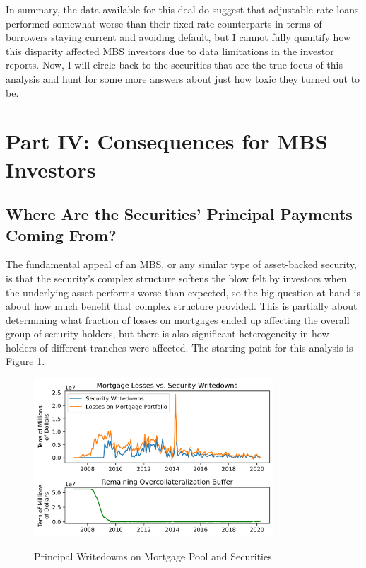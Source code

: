 \documentclass[12pt]{article}
\begin{document}
In summary, the data available for this deal do suggest that adjustable-rate loans performed somewhat worse than their fixed-rate counterparts in terms of borrowers staying current and avoiding default, but I cannot fully quantify how this disparity affected MBS investors due to data limitations in the investor reports. Now, I will circle back to the securities that are the true focus of  this analysis and hunt for some more answers about just how toxic they turned out to be.

\section*{Part IV: Consequences for MBS Investors}

\subsection*{Where Are the Securities' Principal Payments Coming From?}

The fundamental appeal of an MBS, or any similar type of asset-backed security, is that the security’s complex structure softens the blow felt by investors when the underlying asset performs worse than expected, so the big question at hand is about how much benefit that complex structure provided. This is partially about determining what fraction of losses on mortgages ended up affecting the overall group of security holders, but there is also significant heterogeneity in how holders of different tranches were affected. The starting point for this analysis is Figure \ref{fig:timeseries_losses_vs_writedowns}.

\begin{figure}[h]
	\centering
	\caption{Principal Writedowns on Mortgage Pool and Securities}
	\includegraphics[width=0.8\textwidth]{../figures/timeseries_losses_vs_writedowns}
	\label{fig:timeseries_losses_vs_writedowns}
\end{figure}
\end{document}
